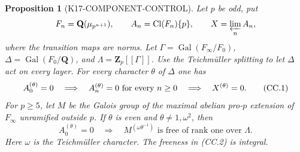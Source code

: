 \documentclass[11pt,a4paper]{article}
\newtheorem{proposition}[theorem]{Proposition}
\theoremstyle{definition}
\begin{document}
\begin{proposition}[K17-COMPONENT-CONTROL]
\label{prop:componentwise-iwasawa-control}
Let $p$ be odd, put
\[
 F_n=\mathbf Q(\mu_{p^{n+1}}),\qquad
 A_n=\operatorname{Cl}(F_n)\{p\},\qquad
 X=\varprojlim_n A_n,
\]
where the transition maps are norms. Let
$\Gamma=\operatorname{Gal}(F_\infty/F_0)$,
$\Delta=\operatorname{Gal}(F_0/\mathbf Q)$, and
$\Lambda=\mathbf Z_p[[\Gamma]]$. Use the Teichm\"uller splitting
to let $\Delta$ act on every layer. For every character $\theta$ of
$\Delta$ one has
\[
 A_0^{(\theta)}=0
 \quad\Longrightarrow\quad
 A_n^{(\theta)}=0\ \hbox{for every }n\geq0
 \quad\Longrightarrow\quad X^{(\theta)}=0.
 \tag{CC.1}
\]
For $p\geq5$, let $M$ be the Galois group of the maximal abelian
pro-$p$ extension of $F_\infty$ unramified outside $p$.
If $\theta$ is even and $\theta\ne1,\omega^2$, then
\[
 A_0^{(\theta)}=0
 \quad\Longrightarrow\quad
 M^{(\omega\theta^{-1})}\text{ is free of rank one over }\Lambda.
 \tag{CC.2}
\]
Here $\omega$ is the Teichm\"uller character. The freeness in
(CC.2) is integral.
\end{proposition}
\end{document}
